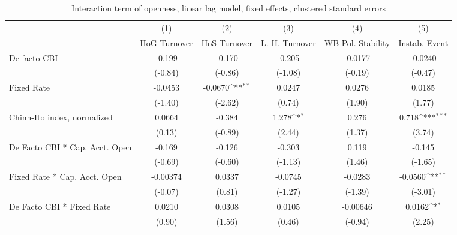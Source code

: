 {
\def\sym#1{\ifmmode^{#1}\else\(^{#1}\)\fi}
\begin{longtable}{l*{5}{c}}
\caption{Interaction term of openness, linear lag model, fixed effects, clustered standard errors \label{kapintlagsDF}}\\
\hline\hline\endfirsthead\hline\endhead\hline\endfoot\endlastfoot
                &\multicolumn{1}{c}{(1)}&\multicolumn{1}{c}{(2)}&\multicolumn{1}{c}{(3)}&\multicolumn{1}{c}{(4)}&\multicolumn{1}{c}{(5)}\\
                &\multicolumn{1}{c}{HoG Turnover}&\multicolumn{1}{c}{HoS Turnover}&\multicolumn{1}{c}{L. H. Turnover}&\multicolumn{1}{c}{WB Pol. Stability}&\multicolumn{1}{c}{Instab. Event}\\
\hline
De facto CBI    &   -0.199         &   -0.170         &   -0.205         &  -0.0177         &  -0.0240         \\
                &  (-0.84)         &  (-0.86)         &  (-1.08)         &  (-0.19)         &  (-0.47)         \\
[1em]
Fixed Rate      &  -0.0453         &  -0.0670\sym{**} &   0.0247         &   0.0276         &   0.0185         \\
                &  (-1.40)         &  (-2.62)         &   (0.74)         &   (1.90)         &   (1.77)         \\
[1em]
Chinn-Ito index, normalized&   0.0664         &   -0.384         &    1.278\sym{*}  &    0.276         &    0.718\sym{***}\\
                &   (0.13)         &  (-0.89)         &   (2.44)         &   (1.37)         &   (3.74)         \\
[1em]
De Facto CBI * Cap. Acct. Open&   -0.169         &   -0.126         &   -0.303         &    0.119         &   -0.145         \\
                &  (-0.69)         &  (-0.60)         &  (-1.13)         &   (1.46)         &  (-1.65)         \\
[1em]
Fixed Rate * Cap. Acct. Open& -0.00374         &   0.0337         &  -0.0745         &  -0.0283         &  -0.0560\sym{**} \\
                &  (-0.07)         &   (0.81)         &  (-1.27)         &  (-1.39)         &  (-3.01)         \\
[1em]
De Facto CBI * Fixed Rate&   0.0210         &   0.0308         &   0.0105         & -0.00646         &   0.0162\sym{*}  \\
                &   (0.90)         &   (1.56)         &   (0.46)         &  (-0.94)         &   (2.25)         \\

\end{longtable}}
